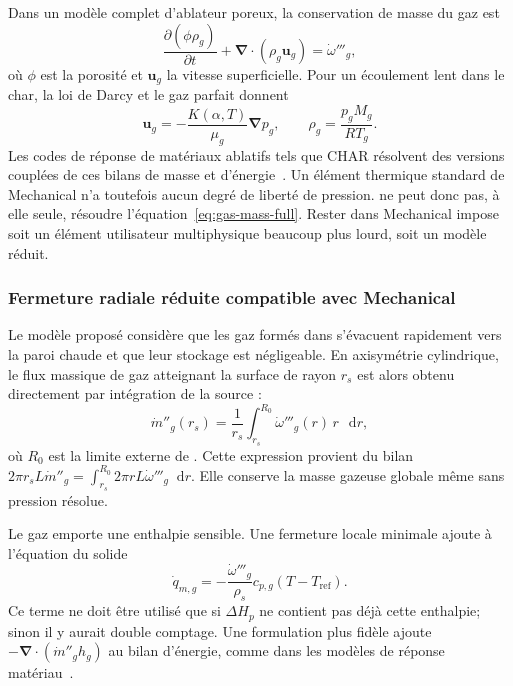 \documentclass[oneside,openany]{amsdtx}
\newcommand{\dd}{\mathop{}\!\mathrm{d}}
\newcommand{\pd}{\partial}
\newcommand{\vect}[1]{\bm{#1}}
\begin{document}
Dans un modèle complet d'ablateur poreux, la conservation de masse du gaz est
\begin{equation}
  \frac{\pd(\phi\rho_g)}{\pd t}
  +\vect\nabla\cdot(\rho_g\vect u_g)=\dot\omega'''_g,
  \label{eq:gas-mass-full}
\end{equation}
où \(\phi\) est la porosité et \(\vect u_g\) la vitesse superficielle. Pour un
écoulement lent dans le char, la loi de Darcy et le gaz parfait donnent
\begin{equation}
  \vect u_g=-\frac{K(\alpha,T)}{\mu_g}\vect\nabla p_g,
  \qquad
  \rho_g=\frac{p_g M_g}{R T_g}.
  \label{eq:darcy-ideal}
\end{equation}
Les codes de réponse de matériaux ablatifs tels que CHAR résolvent des versions
couplées de ces bilans de masse et d'énergie~\cite{amar2010,amar2016,ewing2013}.
Un élément thermique standard de Mechanical n'a toutefois aucun degré de liberté
de pression.  ne peut donc pas, à elle seule, résoudre
l'équation~\eqref{eq:gas-mass-full}. Rester dans Mechanical impose soit un
élément utilisateur multiphysique beaucoup plus lourd, soit un modèle réduit.

\subsubsection{Fermeture radiale réduite compatible avec Mechanical}

Le modèle proposé considère que les gaz formés dans  s'évacuent
rapidement vers la paroi chaude et que leur stockage est négligeable. En
axisymétrie cylindrique, le flux massique de gaz atteignant la surface de rayon
\(r_s\) est alors obtenu directement par intégration de la source :
\begin{equation}
  \boxed{\dot m''_g(r_s)=\frac{1}{r_s}
  \int_{r_s}^{R_0}\dot\omega'''_g(r)\,r\,\dd r,}
  \label{eq:radial-gas-flux}
\end{equation}
où \(R_0\) est la limite externe de . Cette expression provient du
bilan \(2\pi r_sL\dot m''_g=\int_{r_s}^{R_0}2\pi rL
\dot\omega'''_g\dd r\). Elle conserve la masse gazeuse globale même sans
pression résolue.

Le gaz emporte une enthalpie sensible. Une fermeture locale minimale ajoute à
l'équation du solide
\begin{equation}
  \dot q_{m,g}=-\frac{\dot\omega'''_g}{\rho_s}
  c_{p,g}(T-T_\mathrm{ref}).
  \label{eq:gas-local-sink}
\end{equation}
Ce terme ne doit être utilisé que si \(\Delta H_p\) ne contient pas déjà cette
enthalpie; sinon il y aurait double comptage. Une formulation plus fidèle ajoute
\(-\vect\nabla\cdot(\dot m''_g h_g)\) au bilan d'énergie, comme dans les modèles
de réponse matériau~\cite{ewing2013,amar2010}.
\end{document}
